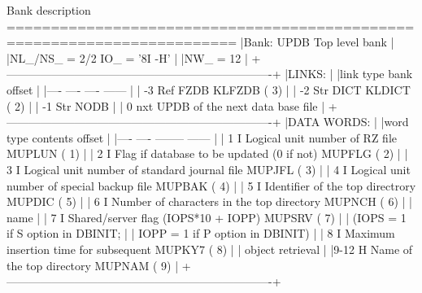 \begin{XMPt}{Bank description}
========================================================================
|Bank:  UPDB                                            Top level bank |
|NL_/NS_ =  2/2                                          IO_ = '8I -H' |
|NW_     =  12                                                         |
+----------------------------------------------------------------------+
|LINKS:                                                                |
|link   type   bank                                        offset      |
|----   ----   ----                                        ------      |
| -3     Ref   FZDB                                        KLFZDB ( 3) |
| -2     Str   DICT                                        KLDICT ( 2) |
| -1     Str   NODB                                                    |
|  0     nxt   UPDB of the next data base file                         |
+----------------------------------------------------------------------+
|DATA WORDS:                                                           |
|word  type  contents                                      offset      |
|----  ----  --------                                      ------      |
|   1    I   Logical unit number of RZ file                MUPLUN ( 1) |
|   2    I   Flag if database to be updated (0 if not)     MUPFLG ( 2) |
|   3    I   Logical unit number of standard journal file  MUPJFL ( 3) |
|   4    I   Logical unit number of special backup file    MUPBAK ( 4) |
|   5    I   Identifier of the top directrory              MUPDIC ( 5) |
|   6    I   Number of characters in the top directory     MUPNCH ( 6) |
|            name                                                      |
|   7    I   Shared/server flag (IOPS*10 + IOPP)           MUPSRV ( 7) |
|            (IOPS = 1 if S option in DBINIT;                          |
|             IOPP = 1 if P option in DBINIT)                          |
|   8    I   Maximum insertion time for subsequent         MUPKY7 ( 8) |
|            object retrieval                                          |
|9-12    H   Name of the top directory                     MUPNAM ( 9) |
+----------------------------------------------------------------------+



\end{XMPt}
